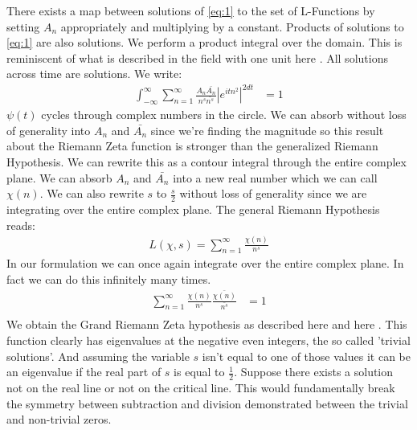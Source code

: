 \documentclass[10pt, oneside]{article}
\begin{document}
  There exists a map between solutions of \ref{eq:1} to the set of L-Functions by setting $A_n$ appropriately and multiplying by a constant.
  Products of solutions to \ref{eq:1} are also solutions. We perform a product integral over the domain.
  This is reminiscent of what is described in the field with one unit here \cite{youtube:f1}. All solutions across time are solutions. We write:
  \begin{align*}
    \int_{-\infty}^{\infty}\sum_{n=1}^{\infty} \frac{A_n \bar{A_n}}{n^{s}\bar{n^s}} |e^{i t n^2} |^{2dt} &=  1
  \end{align*}
  $\psi(t)$ cycles through complex numbers in the circle. We can absorb without loss of generality into $A_n$ and $\bar{A_n}$ since we're finding the magnitude so this result about the Riemann Zeta function is stronger than the generalized Riemann Hypothesis.
  We can rewrite this as a contour integral through the entire complex plane.
  We can absorb $A_n$ and $\bar{A_n}$ into a new real number which we can call $\chi (n)$. We can also rewrite $s$ to $\frac{s}{2}$ without loss of generality since we are integrating over the entire complex plane. The general Riemann Hypothesis reads: \cite{Davenport2000}
  \begin{align}
      L(\chi,s) = \sum_{n=1}^{\infty} \frac{\chi(n)}{n^s} \label{general}
  \end{align}
  In our formulation we can once again integrate over the entire complex plane. In fact we can do this infinitely many times.
  \begin{align}
      \sum_{n=1}^{\infty} \frac{\chi(n)}{n^s} \frac{\bar{\chi(n)}}{\bar{n^s}} & = 1 \\
  \end{align}
  We obtain the Grand Riemann Zeta hypothesis as described here \cite{youtube:f1} and here \cite{Davenport2000}. This function clearly has eigenvalues at the negative even integers, the so called 'trivial solutions'. And assuming the variable $s$ isn't equal to one of those values it can be an eigenvalue if the real part of $s$ is equal to $\frac{1}{2}$.
  Suppose there exists a solution not on the real line or not on the critical line. This would fundamentally break the symmetry between subtraction and division demonstrated between the trivial and non-trivial zeros.
\end{document}
